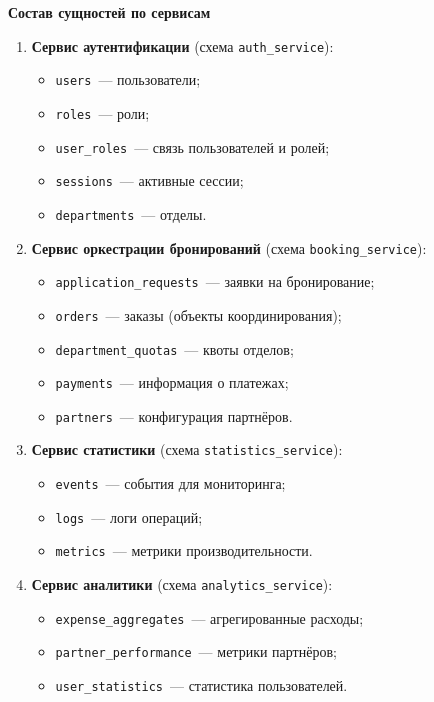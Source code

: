 \documentclass{bmstu}
\begin{document}
\begin{center}
    \textbf{Состав сущностей по сервисам}
\end{center}

\begin{enumerate}
    \item \textbf{Сервис аутентификации} (схема \texttt{auth\_service}):
    \begin{itemize}
        \item \texttt{users}~--- пользователи;
        \item \texttt{roles}~--- роли;
        \item \texttt{user\_roles}~--- связь пользователей и ролей;
        \item \texttt{sessions}~--- активные сессии;
        \item \texttt{departments}~--- отделы.
    \end{itemize}
    
    \item \textbf{Сервис оркестрации бронирований} (схема \texttt{booking\_service}):
    \begin{itemize}
        \item \texttt{application\_requests}~--- заявки на бронирование;
        \item \texttt{orders}~--- заказы (объекты координирования);
        \item \texttt{department\_quotas}~--- квоты отделов;
        \item \texttt{payments}~--- информация о платежах;
        \item \texttt{partners}~--- конфигурация партнёров.
    \end{itemize}
    
    \item \textbf{Сервис статистики} (схема \texttt{statistics\_service}):
    \begin{itemize}
        \item \texttt{events}~--- события для мониторинга;
        \item \texttt{logs}~--- логи операций;
        \item \texttt{metrics}~--- метрики производительности.
    \end{itemize}
    
    \item \textbf{Сервис аналитики} (схема \texttt{analytics\_service}):
    \begin{itemize}
        \item \texttt{expense\_aggregates}~--- агрегированные расходы;
        \item \texttt{partner\_performance}~--- метрики партнёров;
        \item \texttt{user\_statistics}~--- статистика пользователей.
    \end{itemize}
\end{enumerate}
\end{document}
